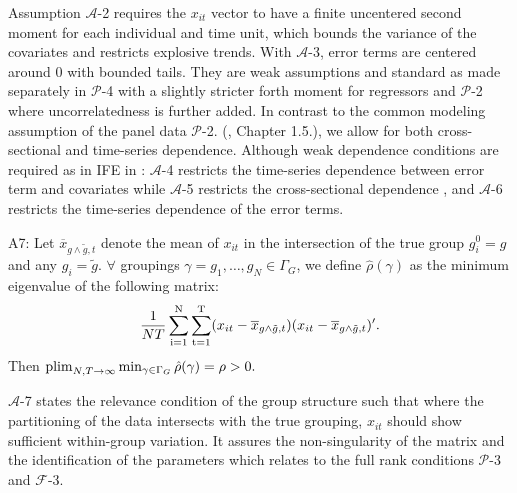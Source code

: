 Assumption $\mathcal{A}$-2 requires the $x_{it}$ vector to have a finite uncentered second moment for each individual and time unit, which bounds the variance of the covariates and restricts explosive trends. %
With $\mathcal{A}$-3, error terms are centered around 0 with bounded tails. They are weak assumptions and standard as made separately in $\mathcal{P}$-4 with a slightly stricter forth moment for regressors and $\mathcal{P}$-2 where uncorrelatedness is further added.
In contrast to the common modeling assumption of the panel data $\mathcal{P}$-2. (\cite{hansen2022econometrics}, Chapter 1.5.), we allow for both cross-sectional and time-series dependence. Although weak dependence conditions are required as in IFE in \textcite{bai2009panel}: $\mathcal{A}$-4 restricts the time-series dependence between error term and covariates while  $\mathcal{A}$-5 restricts the cross-sectional dependence , and $\mathcal{A}$-6 restricts the time-series dependence of the error terms. 

\begin{assumption} A7: Let $\overline{x}_{g\wedge\tilde{g},t}$ denote the mean of $x_{it}$ in the intersection of the true group $g_i^0 = g$ and any $g_i = \tilde{g}$. $\forall$ groupings $\gamma = {g_1, \dots, g_N} \in \Gamma_G$, we define $\hat\rho(\gamma)$ as the minimum eigenvalue of the following matrix: 
\begin{align*}
\dfrac{1}{NT} \operatorname*{\sum_{i=1}^N} \operatorname*{\sum_{t=1}^T} (x_{it} - \overline{x}_{g\wedge\tilde{g},t})(x_{it} - \overline{x}_{g\wedge\tilde{g},t})'.
\end{align*}
Then $\operatorname*{plim}_{N,T \rightarrow \infty}  \min_{\gamma \in \Gamma_G} \hat\rho(\gamma) = \rho > 0.$
\end{assumption}

$\mathcal{A}$-7 states the relevance condition of the group structure such that where the partitioning of the data intersects with the true grouping, $x_{it}$ should show sufficient within-group variation. It assures the non-singularity of the matrix and the identification of the parameters which relates to the full rank conditions $\mathcal{P}$-3 and $\mathcal{F}$-3.

